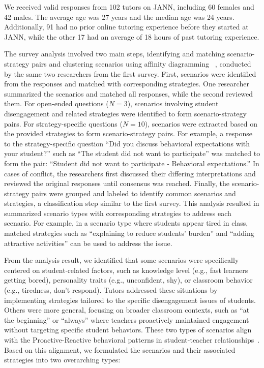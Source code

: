 We received valid responses from 102 tutors on JANN, including 60 females and 42 males. The average age was 27 years and the median age was 24 years. Additionally, 91 had no prior online tutoring experience before they started at JANN, while the other 17 had an average of 18 hours of past tutoring experience. 

The survey analysis involved two main steps, identifying and matching scenario-strategy pairs and clustering scenarios using affinity diagramming ~\cite{kawakita1991original}, conducted by the same two researchers from the first survey. First, scenarios were identified from the responses and matched with corresponding strategies. One researcher summarized the scenarios and matched all responses, while the second reviewed them. For open-ended questions ($N=3$), scenarios involving student disengagement and related strategies were identified to form scenario-strategy pairs. For strategy-specific questions ($N=10$), scenarios were extracted based on the provided strategies to form scenario-strategy pairs. For example, a response to the strategy-specific question ``Did you discuss behavioral expectations with your student?'' such as ``The student did not want to participate'' was matched to form the pair: ``Student did not want to participate - Behavioral expectations.'' In cases of conflict, the researchers first discussed their differing interpretations and reviewed the original responses until consensus was reached. Finally, the scenario-strategy pairs were grouped and labeled to identify common scenarios and strategies, a classification step similar to the first survey. This analysis resulted in summarized scenario types with corresponding strategies to address each scenario. For example, in a scenario type where students appear tired in class, matched strategies such as ``explaining to reduce students' burden'' and ``adding attractive activities'' can be used to address the issue. %


From the analysis result, we identified that some scenarios were specifically centered on student-related factors, such as knowledge level (e.g., fast learners getting bored), personality traits (e.g., unconfident, shy), or classroom behavior (e.g., tiredness, don't respond). Tutors addressed these situations by implementing strategies tailored to the specific disengagement issues of students.
Others were more general, focusing on broader classroom contexts, such as ``at the beginning'' or ``always'' where teachers proactively maintained engagement without targeting specific student behaviors. 
These two types of scenarios align with the Proactive-Reactive behavioral patterns in student-teacher relationships~\cite{yucel2010analysis}. Based on this alignment, we formulated the scenarios and their associated strategies into two overarching types:
    
